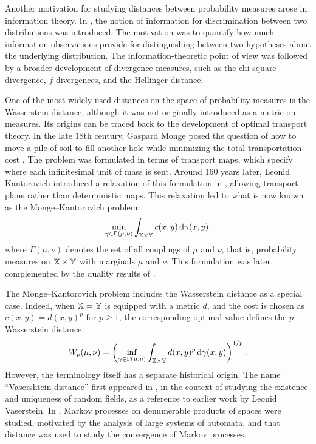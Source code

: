 Another motivation for studying distances between probability measures arose in information theory. In \cite{kullback1951information}, the notion of information for discrimination between two distributions was introduced. The motivation was to quantify how much information observations provide for distinguishing between two hypotheses about the underlying distribution. The information-theoretic point of view was followed by a broader development of divergence measures, such as the chi-square divergence, \(f\)-divergences, and the Hellinger distance.

One of the most widely used distances on the space of probability measures is the Wasserstein distance, although it was not originally introduced as a metric on measures. Its origins can be traced back to the development of optimal transport theory. In the late 18th century, Gaspard Monge posed the question of how to move a pile of soil to fill another hole while minimizing the total transportation cost \cite{monge1781memoire}. The problem was formulated in terms of transport maps, which specify where each infinitesimal unit of mass is sent. Around 160 years later, Leonid Kantorovich introduced a relaxation of this formulation in \cite{kantorovich1942translocation}, allowing transport plans rather than deterministic maps. This relaxation led to what is now known as the Monge--Kantorovich problem:
\begin{equation}\label{equation:kantorovich_formulation}
\min_{\gamma \in \Gamma(\mu, \nu)}
\int_{\mathbb{X}\times \mathbb{Y}} c(x,y)\,\mathrm{d}\gamma(x,y),
\end{equation}
where \(\Gamma(\mu,\nu)\) denotes the set of all couplings of \(\mu\) and \(\nu\), that is, probability measures on \(\mathbb{X}\times\mathbb{Y}\) with marginals \(\mu\) and \(\nu\). This formulation was later complemented by the duality results of \cite{kantorovich1958space}.

The Monge--Kantorovich problem includes the Wasserstein distance as a special case. Indeed, when \(\mathbb{X}=\mathbb{Y}\) is equipped with a metric \(d\), and the cost is chosen as \(c(x,y)=d(x,y)^p\) for \(p\geq 1\), the corresponding optimal value defines the \(p\)-Wasserstein distance,
\[
W_p(\mu,\nu)
=
\left(
\inf_{\gamma\in\Gamma(\mu,\nu)}
\int_{\mathbb{X}\times\mathbb{Y}} d(x,y)^p\,\mathrm d\gamma(x,y)
\right)^{1/p}.
\]
However, the terminology itself has a separate historical origin. The name ``Vasershtein distance'' first appeared in \cite{dobrushin1970prescribing}, in the context of studying the existence and uniqueness of random fields, as a reference to earlier work by Leonid Vaserstein. In \cite{vaserstein1969markov}, Markov processes on denumerable products of spaces were studied, motivated by the analysis of large systems of automata, and that distance was used to study the convergence of Markov processes.

